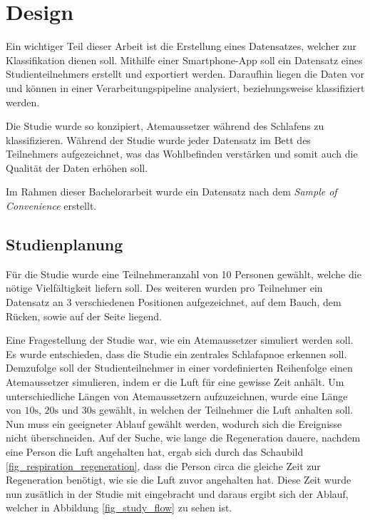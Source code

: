 \chapter{Design}
\label{ch:Design}

Ein wichtiger Teil dieser Arbeit ist die Erstellung eines Datensatzes, welcher zur Klassifikation dienen soll.
Mithilfe einer Smartphone-App soll ein Datensatz eines Studienteilnehmers erstellt und exportiert werden. 
Daraufhin liegen die Daten vor und können in einer Verarbeitungspipeline analysiert, beziehungsweise klassifiziert werden.

Die Studie wurde so konzipiert, Atemaussetzer während des Schlafens zu klassifizieren. 
Während der Studie wurde jeder Datensatz im Bett des Teilnehmers aufgezeichnet, was das Wohlbefinden verstärken und somit auch die Qualität der Daten erhöhen soll.

Im Rahmen dieser Bachelorarbeit wurde ein Datensatz  nach dem \textit{Sample of Convenience} erstellt.

\section{Studienplanung}
Für die Studie wurde eine Teilnehmeranzahl von 10 Personen gewählt, welche die nötige Vielfältigkeit liefern soll.
Des weiteren wurden pro Teilnehmer ein Datensatz an 3 verschiedenen Positionen aufgezeichnet, auf dem Bauch, dem Rücken, sowie auf der Seite liegend.

Eine Fragestellung der Studie war, wie ein Atemaussetzer {\glqq simuliert\grqq} werden soll. 
Es wurde entschieden, dass die Studie ein zentrales Schlafapnoe erkennen soll. 
Demzufolge soll der Studienteilnehmer in einer vordefinierten Reihenfolge einen Atemaussetzer {\glqq simulieren\grqq}, indem er die Luft für eine gewisse Zeit anhält.
Um unterschiedliche Längen von Atemaussetzern aufzuzeichnen, wurde eine Länge von $10\si{\s}$, $20\si{\s}$ und $30\si{\s}$ gewählt, in welchen der Teilnehmer die Luft anhalten soll. 
Nun muss ein geeigneter Ablauf gewählt werden, wodurch sich die Ereignisse nicht überschneiden.
Auf der Suche, wie lange die Regeneration dauere, nachdem eine Person die Luft angehalten hat, ergab sich durch das Schaubild \ref{fig_respiration_regeneration}, dass die Person circa die gleiche Zeit zur Regeneration benötigt, wie sie die Luft zuvor angehalten hat.
Diese Zeit wurde nun zusätlich in der Studie mit eingebracht und daraus ergibt sich der Ablauf, welcher in Abbildung \ref{fig_study_flow} zu sehen ist.


